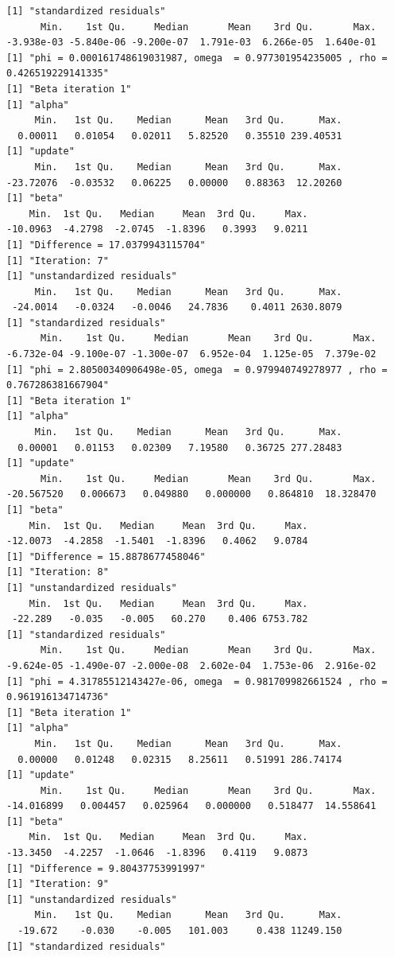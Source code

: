 \documentclass[10pt]{article}
\theoremstyle{definition}
\begin{document}
\begin{itemize}
\begin{verbatim}
[1] "standardized residuals"
      Min.    1st Qu.     Median       Mean    3rd Qu.       Max.
-3.938e-03 -5.840e-06 -9.200e-07  1.791e-03  6.266e-05  1.640e-01
[1] "phi = 0.000161748619031987, omega  = 0.977301954235005 , rho = 0.426519229141335"
[1] "Beta iteration 1"
[1] "alpha"
     Min.   1st Qu.    Median      Mean   3rd Qu.      Max.
  0.00011   0.01054   0.02011   5.82520   0.35510 239.40531
[1] "update"
     Min.   1st Qu.    Median      Mean   3rd Qu.      Max.
-23.72076  -0.03532   0.06225   0.00000   0.88363  12.20260
[1] "beta"
    Min.  1st Qu.   Median     Mean  3rd Qu.     Max.
-10.0963  -4.2798  -2.0745  -1.8396   0.3993   9.0211
[1] "Difference = 17.0379943115704"
[1] "Iteration: 7"
[1] "unstandardized residuals"
     Min.   1st Qu.    Median      Mean   3rd Qu.      Max.
 -24.0014   -0.0324   -0.0046   24.7836    0.4011 2630.8079
[1] "standardized residuals"
      Min.    1st Qu.     Median       Mean    3rd Qu.       Max.
-6.732e-04 -9.100e-07 -1.300e-07  6.952e-04  1.125e-05  7.379e-02
[1] "phi = 2.80500340906498e-05, omega  = 0.979940749278977 , rho = 0.767286381667904"
[1] "Beta iteration 1"
[1] "alpha"
     Min.   1st Qu.    Median      Mean   3rd Qu.      Max.
  0.00001   0.01153   0.02309   7.19580   0.36725 277.28483
[1] "update"
      Min.    1st Qu.     Median       Mean    3rd Qu.       Max.
-20.567520   0.006673   0.049880   0.000000   0.864810  18.328470
[1] "beta"
    Min.  1st Qu.   Median     Mean  3rd Qu.     Max.
-12.0073  -4.2858  -1.5401  -1.8396   0.4062   9.0784
[1] "Difference = 15.8878677458046"
[1] "Iteration: 8"
[1] "unstandardized residuals"
    Min.  1st Qu.   Median     Mean  3rd Qu.     Max.
 -22.289   -0.035   -0.005   60.270    0.406 6753.782
[1] "standardized residuals"
      Min.    1st Qu.     Median       Mean    3rd Qu.       Max.
-9.624e-05 -1.490e-07 -2.000e-08  2.602e-04  1.753e-06  2.916e-02
[1] "phi = 4.31785512143427e-06, omega  = 0.981709982661524 , rho = 0.961916134714736"
[1] "Beta iteration 1"
[1] "alpha"
     Min.   1st Qu.    Median      Mean   3rd Qu.      Max.
  0.00000   0.01248   0.02315   8.25611   0.51991 286.74174
[1] "update"
      Min.    1st Qu.     Median       Mean    3rd Qu.       Max.
-14.016899   0.004457   0.025964   0.000000   0.518477  14.558641
[1] "beta"
    Min.  1st Qu.   Median     Mean  3rd Qu.     Max.
-13.3450  -4.2257  -1.0646  -1.8396   0.4119   9.0873
[1] "Difference = 9.80437753991997"
[1] "Iteration: 9"
[1] "unstandardized residuals"
     Min.   1st Qu.    Median      Mean   3rd Qu.      Max.
  -19.672    -0.030    -0.005   101.003     0.438 11249.150
[1] "standardized residuals"

\end{verbatim}
\end{itemize}
\end{document}
